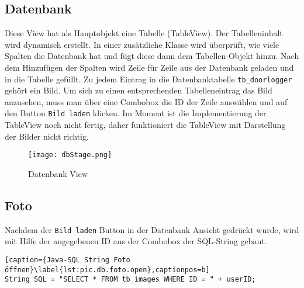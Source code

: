 \subsection{Datenbank}
\label{subsec.datenbank}
Diese View hat als Hauptobjekt eine Tabelle (TableView). Der Tabelleninhalt wird dynamisch erstellt. In einer zusätzliche Klasse wird überprüft, wie viele Spalten die Datenbank hat und fügt diese dann dem Tabellen-Objekt hinzu. Nach dem Hinzufügen der Spalten wird Zeile für Zeile aus der Datenbank geladen und in die Tabelle gefüllt. Zu jedem Eintrag in die Datenbanktabelle \texttt{tb\_doorlogger} gehört ein Bild. Um sich zu einen entsprechenden Tabelleneintrag das Bild anzusehen, muss man über eine Combobox die ID der Zeile auswählen und auf den Button \texttt{Bild laden} klicken. Im Moment ist die Implementierung der TableView noch nicht fertig, daher funktioniert die TableView mit Darstellung der Bilder nicht richtig. %

\begin{figure}[h]
  \begin{center}
    \texttt{[image: dbStage.png]}
  		  \caption{Datenbank View}
     \label{fig.DatenbankFenster}
  \end{center}
\end{figure}

\subsection{Foto}
\label{subsec.foto}
Nachdem der \texttt{Bild laden} Button in der Datenbank Ansicht gedrückt wurde, wird mit Hilfe der angegebenen ID aus der Combobox der SQL-String gebaut.

\begin{lstlisting}[caption={Java-SQL String Foto öffnen}\label{lst:pic.db.foto.open},captionpos=b]
String SQL = "SELECT * FROM tb_images WHERE ID = " + userID;
\end{lstlisting}

